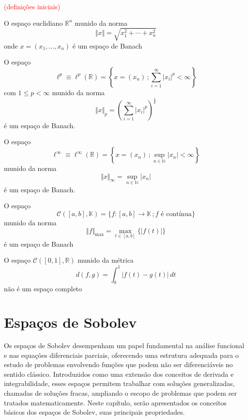 \documentclass[a4paper, 11pt]{book}
\theoremstyle{definition}
\newcommand{\bN}{\mathbb{N}}
\newcommand{\bR}{\mathbb{R}}
\newcommand{\bK}{\mathbb{K}}
\newcommand{\cC}{\mathcal{C}}
\begin{document}
\textcolor{red}{(definições iniciais)}

\begin{ex}
    O espaço euclidiano $\bR^n$ munido da norma
    \[
        \Vert x \Vert = \sqrt{x_1^2 + \cdots + x_n^2}
    \]
    onde $x = (x_1,\dots,x_n)$ é um espaço de Banach
\end{ex}

\begin{ex}
    O espaço
    \[
        \ell^p \equiv \ell^p(\bR) = \left\{ x = (x_n) \,; \sum_{i=1}^{\infty} |x_i|^p < \infty \right\}
    \]
    com $1 \leqslant p < \infty$ munido da norma
    \[
        \Vert x \Vert_p = \left( \sum_{i=1}^{\infty} |x_i|^p \right)^{\frac{1}{p}}
    \]
    é um espaço de Banach.
\end{ex}

\begin{ex}
    O espaço
    \[
        \ell^\infty \equiv \ell^\infty(\bR) = \left\{ x = (x_n) \,; \sup_{n \in \bN} |x_n| < \infty \right\}
    \]
    munido da norma
    \[
        \Vert x \Vert_\infty = \sup_{n \in \bN} |x_n|
    \]
    é um espaço de Banach.
\end{ex}

\begin{ex}
    O espaço
    \[
        \cC([a,b], \bK) = \{f : [a,b] \to \bK \,; f \text{ é contínua}\}
    \]
    munido da norma
    \[
        \Vert f \Vert_{\max} = \max_{t \in [a,b]} \{|f(t)|\}
    \]
    é um espaço de Banach
\end{ex}

\begin{ex}
    O espaço $\cC([0,1], \bR)$ munido da métrica
    \[
        d(f,g) = \int_0^1 |f(t) - g(t)| \, dt
    \]
    não é um espaço completo
\end{ex}


\chapter{Espaços de Sobolev}

Os espaços de Sobolev desempenham um papel fundamental na análise funcional e nas equações diferenciais parciais, oferecendo uma estrutura adequada para o estudo de problemas envolvendo funções que podem não ser diferenciáveis no sentido clássico. Introduzidos como uma extensão dos conceitos de derivada e integrabilidade, esses espaços permitem trabalhar com soluções generalizadas, chamadas de soluções fracas, ampliando o escopo de problemas que podem ser tratados matematicamente. Neste capítulo, serão apresentados os conceitos básicos dos espaços de Sobolev, suas principais propriedades.
\end{document}
